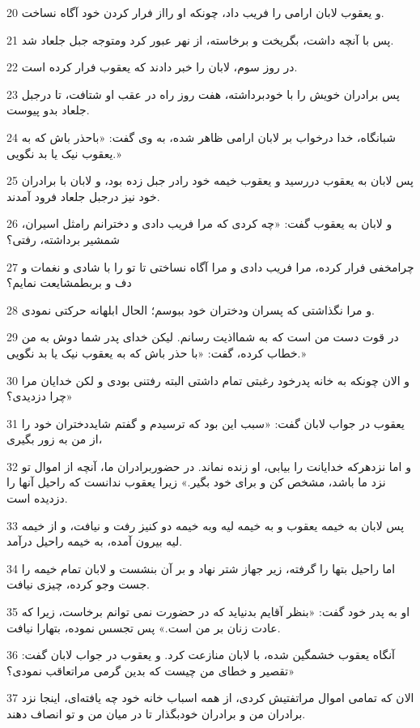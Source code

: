 \par 20 و یعقوب لابان ارامی را فریب داد، چونکه او رااز فرار کردن خود آگاه نساخت.
\par 21 پس با آنچه داشت، بگریخت و برخاسته، از نهر عبور کرد ومتوجه جبل جلعاد شد.
\par 22 در روز سوم، لابان را خبر دادند که یعقوب فرار کرده است.
\par 23 پس برادران خویش را با خودبرداشته، هفت روز راه در عقب او شتافت، تا درجبل جلعاد بدو پیوست.
\par 24 شبانگاه، خدا درخواب بر لابان ارامی ظاهر شده، به وی گفت: «باحذر باش که به یعقوب نیک یا بد نگویی.»
\par 25 پس لابان به یعقوب دررسید و یعقوب خیمه خود رادر جبل زده بود، و لابان با برادران خود نیز درجبل جلعاد فرود آمدند.
\par 26 و لابان به یعقوب گفت: «چه کردی که مرا فریب دادی و دخترانم رامثل اسیران، شمشیر برداشته، رفتی؟
\par 27 چرامخفی فرار کرده، مرا فریب دادی و مرا آگاه نساختی تا تو را با شادی و نغمات و دف و بربطمشایعت نمایم؟
\par 28 و مرا نگذاشتی که پسران ودختران خود ببوسم؛ الحال ابلهانه حرکتی نمودی.
\par 29 در قوت دست من است که به شمااذیت رسانم. لیکن خدای پدر شما دوش به من خطاب کرده، گفت: «با حذر باش که به یعقوب نیک یا بد نگویی.»
\par 30 و الان چونکه به خانه پدرخود رغبتی تمام داشتی البته رفتنی بودی و لکن خدایان مرا چرا دزدیدی؟»
\par 31 یعقوب در جواب لابان گفت: «سبب این بود که ترسیدم و گفتم شایددختران خود را از من به زور بگیری،
\par 32 و اما نزدهر‌که خدایانت را بیابی، او زنده نماند. در حضوربرادران ما، آنچه از اموال تو نزد ما باشد، مشخص کن و برای خود بگیر.» زیرا یعقوب ندانست که راحیل آنها را دزدیده است.
\par 33 پس لابان به خیمه یعقوب و به خیمه لیه وبه خیمه دو کنیز رفت و نیافت، و از خیمه لیه بیرون آمده، به خیمه راحیل درآمد.
\par 34 اما راحیل بتها را گرفته، زیر جهاز شتر نهاد و بر آن بنشست و لابان تمام خیمه را جست وجو کرده، چیزی نیافت.
\par 35 او به پدر خود گفت: «بنظر آقایم بدنیاید که در حضورت نمی توانم برخاست، زیرا که عادت زنان بر من است.» پس تجسس نموده، بتهارا نیافت.
\par 36 آنگاه یعقوب خشمگین شده، با لابان منازعت کرد. و یعقوب در جواب لابان گفت: «تقصیر و خطای من چیست که بدین گرمی مراتعاقب نمودی؟
\par 37 الان که تمامی اموال مراتفتیش کردی، از همه اسباب خانه خود چه یافته‌ای، اینجا نزد برادران من و برادران خودبگذار تا در میان من و تو انصاف دهند.
